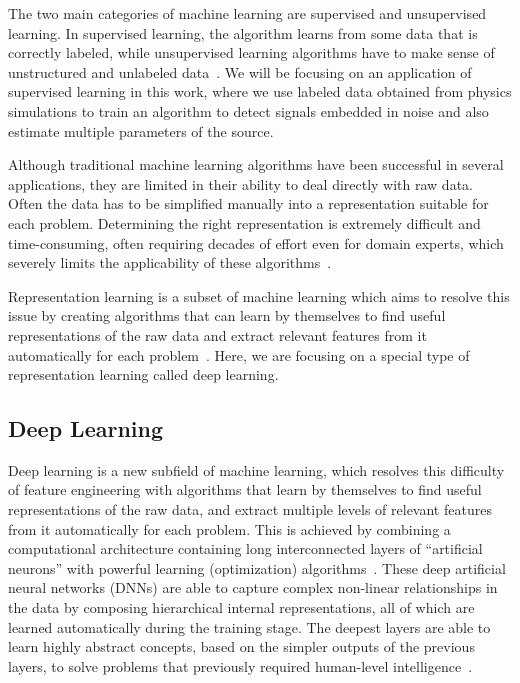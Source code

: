 \documentclass[aps,prd,%
amsmath,floats,floatfix, twocolumn, superscriptaddress,nofootinbib,showpacs]{revtex4-1}
\begin{document}
The two main categories of machine learning are supervised and unsupervised learning. In supervised learning, the algorithm learns from some data that is correctly labeled, while unsupervised learning algorithms have to make sense of unstructured and unlabeled data~\cite{DL-Review}. We will be focusing on an application of supervised learning in this work, where we use labeled data obtained from physics simulations to train an algorithm to detect signals embedded in noise and also estimate multiple parameters of the source.

Although traditional machine learning algorithms have been successful in several applications, they are limited in their ability to deal directly with raw data. Often the data has to be simplified manually into a representation suitable for each problem. Determining the right representation is extremely difficult and time-consuming, often requiring decades of effort even for domain experts, which severely limits the applicability of these algorithms~\cite{DL-Book}.

Representation learning is a subset of machine learning which aims to resolve this issue by creating algorithms that can learn by themselves to find useful representations of the raw data and extract relevant features from it automatically for each problem~\cite{RL-Review}. Here, we are focusing on a special type of representation learning called deep learning.

\subsection*{Deep Learning}

Deep learning is a new subfield of machine learning, which resolves this difficulty of feature engineering with algorithms that learn by themselves to find useful representations of the raw data, and extract multiple levels of relevant features from it automatically for each problem. This is achieved by combining a computational architecture containing long interconnected layers of ``artificial neurons'' with powerful learning (optimization) algorithms~\cite{DL-Nature,DL-Book}. These deep artificial neural networks (DNNs) are able to capture complex non-linear relationships in the data by composing hierarchical internal representations, all of which are learned automatically during the training stage. The deepest layers are able to learn highly abstract concepts, based on the simpler outputs of the previous layers, to solve problems that previously required human-level intelligence~\cite{DL-Review}.  
\end{document}
